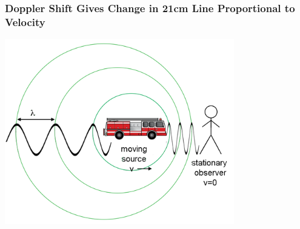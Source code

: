 \documentclass{beamer}
\begin{document}
\begin{frame}
  \frametitle{Doppler Shift Gives Change in 21cm Line Proportional to Velocity}
  \includegraphics[width=0.75\textwidth]{siren_moving}
\end{frame}
\end{document}
